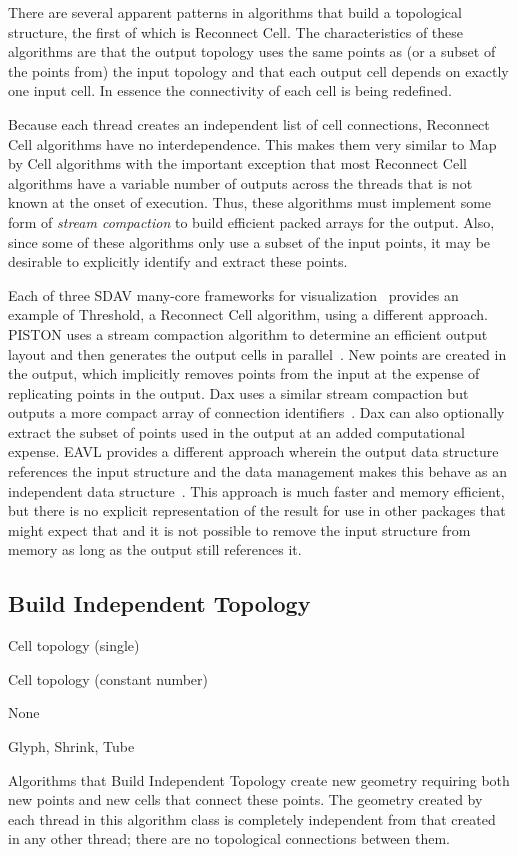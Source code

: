 \documentclass{sig-alternate}
\newcommand*{\lcite}[1]{~\cite{#1}}
\newcommand*{\keyterm}[1]{\emph{#1}}
\newcommand{\algclass}[1]{\textsf{#1}}
\newcommand{\alg}[1]{#1}
\newcommand{\algorithmclasssection}[1]{\subsection*{#1}}
\newcommand{\algorithmclass}[5]{
  \algorithmclasssection{#1} %
  \begin{description}[leftmargin=9em,style=nextline,noitemsep]
    \raggedright
  \item[Input] #2
  \item[Output] #3
  \item[Interdependence] #4
  \item[Algorithms] #5
  \end{description}
}
\begin{document}
\noindent
There are several apparent patterns in algorithms that build a topological
structure, the first of which is \algclass{Reconnect Cell}. The
characteristics of these algorithms are that the output topology uses the
same points as (or a subset of the points from) the input topology and that
each output cell depends on exactly one input cell. In essence the
connectivity of each cell is being redefined.

Because each thread creates an independent list of cell connections,
\algclass{Reconnect Cell} algorithms have no interdependence. This makes
them very similar to \algclass{Map by Cell} algorithms with the important
exception that most \algclass{Reconnect Cell} algorithms have a variable
number of outputs across the threads that is not known at the onset of
execution. Thus, these algorithms must implement some form of
\keyterm{stream compaction} to build efficient packed arrays for the
output. Also, since some of these algorithms only use a subset of the input
points, it may be desirable to explicitly identify and extract these
points.

Each of three SDAV many-core frameworks for visualization\lcite{Sewell2012}
provides an example of \alg{Threshold}, a \algclass{Reconnect Cell}
algorithm, using a different approach. PISTON uses a stream compaction
algorithm to determine an efficient output layout and then generates the
output cells in parallel\lcite{PISTON}. New points are created in the
output, which implicitly removes points from the input at the expense of
replicating points in the output. Dax uses a similar stream compaction but
outputs a more compact array of connection
identifiers\lcite{Maynard2013}. Dax can also optionally extract the subset
of points used in the output at an added computational expense. EAVL
provides a different approach wherein the output data structure references
the input structure and the data management makes this behave as an
independent data structure\lcite{Meredith2012}. This approach is much
faster and memory efficient, but there is no explicit representation of the
result for use in other packages that might expect that and it is not
possible to remove the input structure from memory as long as the output
still references it.


\algorithmclass{Build Independent Topology}
               {Cell topology (single)} %
               {Cell topology (constant number)} %
               {None} %
               {Glyph, Shrink, Tube}

\noindent
Algorithms that \algclass{Build Independent Topology} create new geometry
requiring both new points and new cells that connect these points. The
geometry created by each thread in this algorithm class is completely
independent from that created in any other thread; there are no topological
connections between them.
\end{document}
